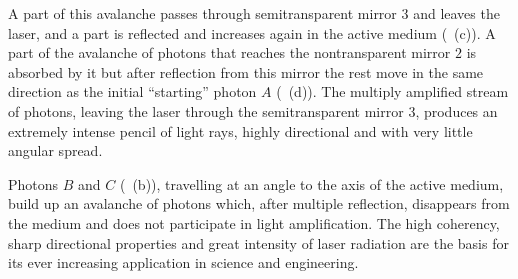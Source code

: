 A part of this avalanche passes through semitransparent mirror $\mathit{3}$ and leaves the laser, and a part is reflected and increases again in the active medium (~(c)). A part of the avalanche of photons that reaches the nontransparent mirror $\mathit{2}$ is absorbed by it but after reflection from this mirror the rest move in the same direction as the initial ``starting'' photon $A$
(~(d)). The multiply amplified stream of photons, leaving the laser through the semitransparent mirror $\mathit{3}$, produces an extremely intense pencil of light rays, highly directional and with very little angular spread.

Photons $B$ and $C$ (~(b)), travelling at an angle to the axis of the active medium, build up an avalanche of photons which, after multiple reflection, disappears from the medium and does not participate in light amplification. The high coherency, sharp directional properties and great intensity of laser radiation are the basis for its ever increasing application in science and engineering.
